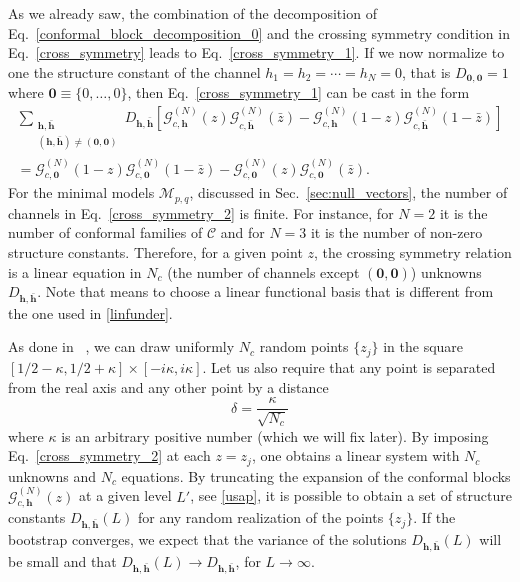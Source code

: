 \documentclass[a4paper,11pt]{article}
\begin{document}
As we already saw, the combination of the decomposition of Eq.~\eqref{conformal_block_decomposition_0}
and the crossing symmetry condition in Eq.~\eqref{cross_symmetry} leads to Eq.~\eqref{cross_symmetry_1}. 
If we now normalize to one the structure constant of the channel $h_1=h_2=\cdots=h_N=0$, that is $D_{\boldsymbol{0}, \boldsymbol{0}}=1$
where $\boldsymbol{0}\equiv \{0,\dots, 0\}$, then Eq.~\eqref{cross_symmetry_1} can be cast in the form
\begin{multline}\label{cross_symmetry_2}
\sum_{\substack{\boldsymbol{h},\boldsymbol{\bar{h}} \\ (\boldsymbol{h},\boldsymbol{\bar{h}})\neq(\boldsymbol{0},\boldsymbol{0})}}D_{\boldsymbol{h},\boldsymbol{\bar{h}}}
 \left[\mathcal{G}_{c,\boldsymbol{h}}^{(N)}(z)\mathcal{G}_{c, \boldsymbol{\bar{h}}}^{(N)}(\bar{z})-
 \mathcal{G}_{c,\boldsymbol{h}}^{(N)}(1-z)\mathcal{G}_{c,\boldsymbol{\bar{h}}}^{(N)}(1-\bar{z})\right]
 \\=\mathcal{G}_{c,\boldsymbol{0}}^{(N)}(1-z)\mathcal{G}_{c, \boldsymbol{0}}^{(N)}(1-\bar{z})-
 \mathcal{G}_{c,\boldsymbol{0}}^{(N)}(z)\mathcal{G}_{c,\boldsymbol{0}}^{(N)}(\bar{z}).
\end{multline}
For the minimal models $\mathcal{M}_{p, q}$, discussed in Sec.~\ref{sec:null_vectors}, 
the number of channels in Eq.~\eqref{cross_symmetry_2} is finite. For instance, for $N=2$ 
it is the number of conformal families of $\mathcal{C}$ and for $N=3$ it is the number of 
non-zero structure constants. Therefore, for a given point $z$, the crossing symmetry relation 
is a linear equation in  $N_c$ (the number of channels except $(\boldsymbol{0}, \boldsymbol{0})$) 
unknowns $D_{\boldsymbol{h},\boldsymbol{\bar{h}}}$. Note that means to choose a linear functional basis that is different from the one used in \eqref{linfunder}. 

As done in ~\cite{SR}, we can draw uniformly $N_c$ random points $\{z_{j}\}$ in the square $[1/2-\kappa, 1/2+\kappa]\times[-i\kappa, i\kappa]$.  Let us also require that any point is separated from the real axis and any other point by a distance 
\begin{equation}
 \delta=\frac{\kappa}{\sqrt{N_c}}
\end{equation}
where $\kappa$ is an arbitrary positive number (which we will fix later). By imposing Eq.~\eqref{cross_symmetry_2} at each $z=z_j$, one obtains a linear system with $N_c$ unknowns and $N_c$ equations. By truncating the expansion of the conformal blocks $\mathcal{G}_{c, \boldsymbol{h}}^{(N)}(z)$
at a given level $L'$, see \eqref{usap}, it is possible to obtain a set of structure constants $D_{\boldsymbol{h},\boldsymbol{\bar{h}}}(L)$ for any random realization of the points $\{z_j\}$. If the bootstrap converges,  we expect that the variance of the solutions $D_{\boldsymbol{h},\boldsymbol{\bar{h}}}(L)$ will be small and that $D_{\boldsymbol{h},\boldsymbol{\bar{h}}}(L)\to D_{\boldsymbol{h},\boldsymbol{\bar{h}}}$, for $L\to \infty$.  
\end{document}
